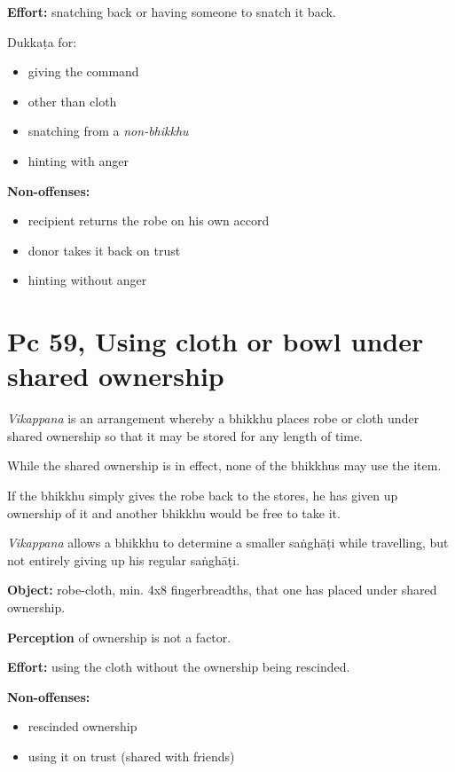 \textbf{Effort:} snatching back or having someone to snatch it back.

Dukkaṭa for:

\begin{itemize}
\tightlist
\item
  giving the command
\item
  other than cloth
\item
  snatching from a \emph{non-bhikkhu}
\item
  hinting with anger
\end{itemize}

\textbf{Non-offenses:}

\begin{itemize}
\tightlist
\item
  recipient returns the robe on his own accord
\item
  donor takes it back on trust
\item
  hinting without anger
\end{itemize}

\section{Pc 59, Using cloth or bowl under shared ownership}

\emph{Vikappana} is an arrangement whereby a bhikkhu places robe or
cloth under shared ownership so that it may be stored for any length of
time.

While the shared ownership is in effect, none of the bhikkhus may use
the item.

If the bhikkhu simply gives the robe back to the stores, he has given up
ownership of it and another bhikkhu would be free to take it.

\emph{Vikappana} allows a bhikkhu to determine a smaller saṅghāṭi while
travelling, but not entirely giving up his regular saṅghāṭi.

\textbf{Object:} robe-cloth, min. 4x8 fingerbreadths, that one has
placed under shared ownership.

\textbf{Perception} of ownership is not a factor.

\textbf{Effort:} using the cloth without the ownership being rescinded.

\textbf{Non-offenses:}

\begin{itemize}
\tightlist
\item
  rescinded ownership
\item
  using it on trust (shared with friends)
\end{itemize}


